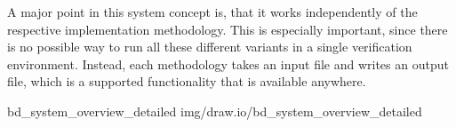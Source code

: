 A major point in this system concept is, that it works independently of the respective implementation methodology.
This is especially important, since there is no possible way to run all these different variants in a single verification environment.
Instead, each methodology takes an input file and writes an output file, which is a supported functionality that is available anywhere.

 {bd_system_overview_detailed} {img/draw.io/bd_system_overview_detailed}


